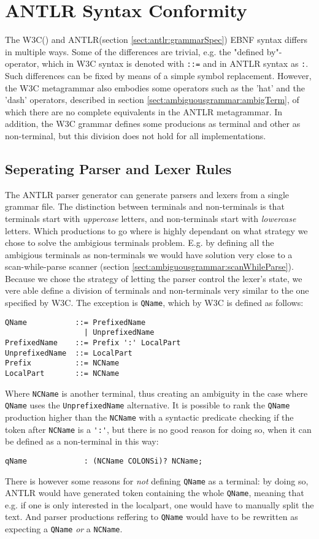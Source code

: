 \section{ANTLR Syntax Conformity}
The W3C(\cite{w3c00}) and ANTLR(section \ref{sect:antlr:grammarSpec}) EBNF syntax differs in multiple ways. Some of the differences are trivial, e.g. the "defined by"-operator, which in W3C syntax is denoted with \verb!::=! and in ANTLR syntax as \verb!:!. Such differences can be fixed by means of a simple symbol replacement. However, the W3C metagrammar also embodies some operators such as the 'hat' and the 'dash' operators, described in section \ref{sect:ambiguousgrammar:ambigTerm}, of which there are no complete equivalents in the ANTLR metagrammar. In addition, the W3C grammar defines some producions as terminal and other as non-terminal, but this division does not hold for all implementations.

\subsection{Seperating Parser and Lexer Rules}

The ANTLR parser generator can generate parsers and lexers from a single grammar file. The distinction between terminals and non-terminals is that terminals start with \emph{uppercase} letters, and non-terminals start with \emph{lowercase} letters. Which productions to go where is highly dependant on what strategy we chose to solve the ambigious terminals problem. E.g. by defining all the ambigious terminals as non-terminals we would have solution very close to a scan-while-parse scanner (section \ref{sect:ambiguousgrammar:scanWhileParse}). Because we chose the strategy of letting the parser control the lexer's state, we vere able define a division of terminals and non-terminals very similar to the one specified by W3C. The exception is \verb!QName!, which by W3C is defined as follows:
\begin{verbatim}
QName           ::= PrefixedName
                  | UnprefixedName
PrefixedName    ::= Prefix ':' LocalPart 
UnprefixedName  ::= LocalPart 
Prefix          ::= NCName
LocalPart       ::= NCName
\end{verbatim}
Where \verb!NCName! is another terminal, thus creating an ambiguity in the case where \verb!QName! uses the \verb!UnprefixedName! alternative. It is possible to rank the \verb!QName! production higher than the \verb!NCName! with a syntactic predicate checking if the token after \verb!NCName! is a \verb!':'!, but there is no good reason for doing so, when it can be defined as a non-terminal in this way:
\begin{verbatim}
qName             : (NCName COLONSi)? NCName;
\end{verbatim}
There is however some reasons for \emph{not} defining \verb!QName! as a terminal: by doing so, ANTLR would have generated token containing the whole \verb!QName!, meaning that e.g. if one is only interested in the localpart, one would have to manually split the text. And parser productions reffering to \verb!QName! would have to be rewritten as expecting a \verb!QName! \emph{or} a \verb!NCName!.

